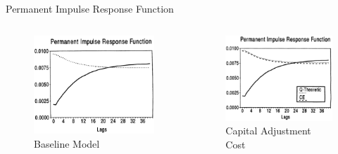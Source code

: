 \documentclass[10pt]{beamer}
\begin{document}
\begin{frame}{Permanent Impulse Response Function}
    \begin{columns}[T,onlytextwidth]
        \begin{figure}
            \centering
            \includegraphics[width=\linewidth]{figures/Base_per_IRF.png}
            \centering\caption{Baseline Model}
        \end{figure}

        \begin{figure}
            \centering
            \includegraphics[width=\linewidth]{figures/K_per_IRF.png}
            \centering\caption{Capital Adjustment Cost}
        \end{figure}


\end{columns}
\end{frame}
\end{document}
